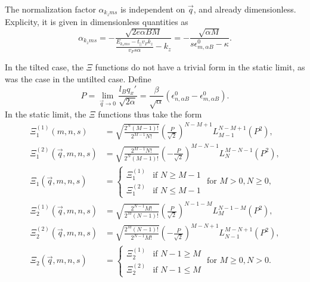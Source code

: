 The normalization factor \( \alpha _{k_z m s} \) is independent on \( \vec{q} \), and already dimensionless.
Explicity, it is given in dimensionless quantities as
\begin{equation}
  \alpha _{k_z m s} =
  -\frac{\sqrt{2 e \alpha B M}}{ \frac{E_{k_{z} m s} - t_{\parallel} v_F k_z}{v_{F} s \alpha } - k_z}
  = -\frac{\sqrt{\alpha M}}{s \epsilon ^{0}_{m, \alpha B} - \kappa }.
\end{equation}

In the tilted case, the \( \Xi \) functions do not have a trivial form in the static limit, as was the case in the untilted case.
Define
\[
P = \lim_{\vec{q} \to 0} \frac{l_B q_x'}{\sqrt{2 \alpha } } = \frac{\beta}{\sqrt{\alpha}} (\epsilon^0_{n, \alpha B} - \epsilon^0_{m, \alpha B}).
\]
In the static limit, the \( \Xi \) functions thus take the form
\begin{align}
  \Xi_1 ^{(1)}(m, n, s) &= \sqrt{\frac{2^N (M-1)!}{2^{M-1} N!}}
                                   \left( \frac{P}{\sqrt{2}} \right)^{N-M + 1}
                                   L^{N-M+1}_{M-1} \left( P^2 \right),\\
  \Xi_1 ^{(2)}(\vec{q}, m, n, s) &= \sqrt{\frac{2^{M-1} N!}{2^N (M-1)!}}
                                   \left( -\frac{P}{\sqrt{2}} \right)^{M-N - 1}
                                   L^{M - N - 1}_N \left( P^2 \right),\\
  \Xi_1(\vec{q}, m, n, s) &=
          \begin{cases}
            \Xi _1 ^{(1)} & \text{if } N \geq M-1\\
            \Xi _1 ^{(2)} & \text{if } N \leq M-1
          \end{cases} \text{ for } M>0, N \geq 0,
\end{align}
\begin{align}
  \Xi_2 ^{(1)}(\vec{q}, m, n, s) &= \sqrt{\frac{2^{N-1} M!}{2^M (N-1)!}}
                                   \left( \frac{P}{\sqrt{2}} \right)^{N-1 - M}
                                   L^{N-1 -M}_{M} \left( P^2 \right),\\
  \Xi_2 ^{(2)}(\vec{q}, m, n, s) &= \sqrt{\frac{2^M (N-1)!}{2^{N-1} M!}}
                                   \left( -\frac{P}{\sqrt{2}} \right)^{M-N + 1}
                                   L^{M - N + 1}_{N-1} \left( P^2 \right),\\
  \Xi_2(\vec{q}, m, n, s) &=
          \begin{cases}
            \Xi _2 ^{(1)} & \text{if } N-1 \geq M\\
            \Xi _2 ^{(2)} & \text{if } N-1 \leq M
          \end{cases} \text{ for } M \geq 0, N > 0.
\end{align}

